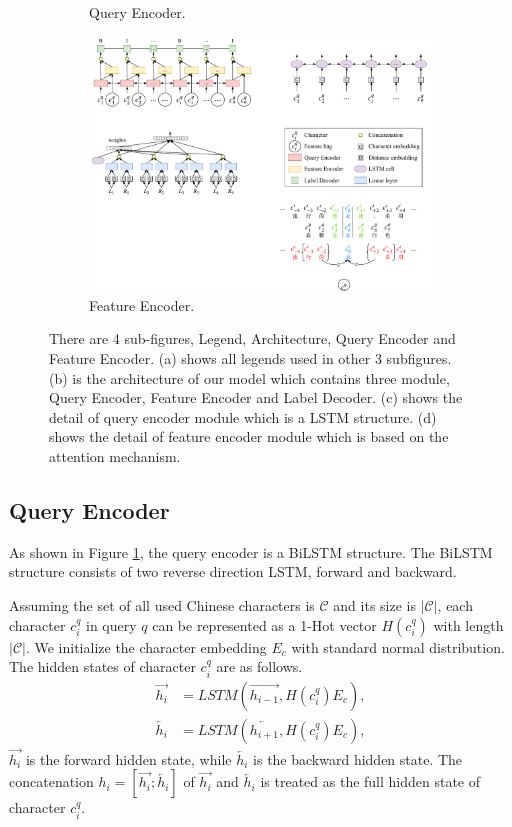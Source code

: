 \begin{figure}
\begin{subfigure}[b]{1\columnwidth}
		\caption[]%
		{{\small Query Encoder.}}
		\label{fig:21}
	\end{subfigure}
	\hfill
	\begin{subfigure}[b]{1\columnwidth}
		\centering
		\includegraphics[width=0.9\columnwidth]{figures/model-4.pdf}
		\caption[]%
		{{\small Feature Encoder.}}
		\label{fig:22}
	\end{subfigure}
	\caption[]
	{\small There are 4 sub-figures, Legend, Architecture, Query Encoder and Feature Encoder. (a) shows all legends used in other 3 subfigures. (b) is the architecture of our model which contains three module, Query Encoder, Feature Encoder and Label Decoder. (c) shows the detail of query encoder module which is a LSTM structure. (d) shows the detail of feature encoder module which is based on the attention mechanism.}
	\label{fig:model}
	\vspace{-10pt}
\end{figure}

\subsection{Query Encoder}

As shown in Figure \ref{fig:21}, the query encoder is a BiLSTM structure. The BiLSTM structure consists of two reverse direction LSTM, forward and backward.

Assuming the set of all used Chinese characters is $\mathcal{C}$ and its size is $|\mathcal{C}|$, each character $c_i^q$ in query $q$ can be represented as a 1-Hot vector $H(c_i^q)$ with length $|\mathcal{C}|$. We initialize the character embedding $E_c$ with standard normal distribution. The hidden states of character $c_i^q$ are as follows.
\begin{align*}
	\overrightarrow{h_i} & = LSTM(\overrightarrow{h_{i-1}}, H(c_i^q) E_c),
	\\
	\overleftarrow{h_i}  & = LSTM(\overleftarrow{h_{i+1}}, H(c_i^q) E_c),
\end{align*}
$\overrightarrow{h_i}$ is the forward hidden state, while $\overleftarrow{h_i}$ is the backward hidden state. The concatenation $h_i=[\overrightarrow{h_i}; \overleftarrow{h_i}]$ of $\overrightarrow{h_i}$ and $\overleftarrow{h_i}$ is treated as the full hidden state of character $c_i^q$.



